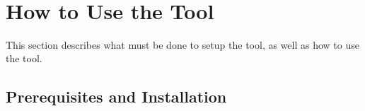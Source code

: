 \documentclass{article}
\begin{document}
	
\pagebreak~\pagebreak
\section{How to Use the Tool}
This section describes what must be done to setup the tool, as well as how to use the tool.

\subsection{Prerequisites and Installation}
\end{document}
